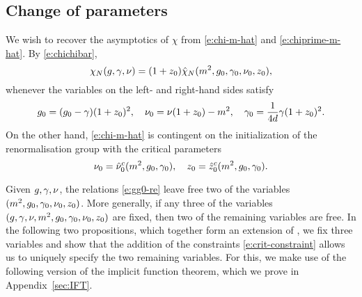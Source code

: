 
\subsection{Change of parameters}
\label{sec:nuztilde}

We wish to recover the asymptotics of $\chi$ from \eqref{e:chi-m-hat} and
\eqref{e:chiprime-m-hat}. By \eqref{e:chichibar},
\begin{equation}
\label{e:chichihat}
\chi_N(g, \gamma, \nu)
	=
(1 + z_0) \hat\chi_N(m^2, g_0, \gamma_0, \nu_0, z_0),
\end{equation}
whenever the variables on the left- and right-hand sides satisfy
\begin{equation}
\label{e:gg0-re}
g_0 = (g_0 - \gamma) (1 + z_0)^2,
\quad
\nu_0 = \nu (1 + z_0) - m^2,
\quad
\gamma_0 = \frac{1}{4d} \gamma (1 + z_0)^2.
\end{equation}
On the other hand, \eqref{e:chi-m-hat} is contingent on the initialization of
the renormalisation group with the critical parameters
\begin{equation}
\label{e:crit-constraint}
\nu_0 = \hat \nu_0^c(m^2, g_0, \gamma_0),
	\quad
z_0   = \hat z_0^c(m^2, g_0, \gamma_0).
\end{equation}

Given $g,\gamma,\nu$,
the relations \eqref{e:gg0-re} leave free two of the variables
$(m^2, g_0, \gamma_0, \nu_0, z_0)$.
More generally, if any three of the variables
$(g, \gamma, \nu, m^2, g_0, \gamma_0, \nu_0, z_0)$
are fixed, then two of the remaining variables are free.
In the following two propositions, which together form an extension of
\cite[Proposition~\ref{log-prop:changevariables}]{BBS-saw4-log},
we fix three variables and show that the addition of the constraints
\eqref{e:crit-constraint}
allows us to uniquely specify the two remaining variables.
For this, we make use of the following version of the
implicit function theorem, which we prove in Appendix~\ref{sec:IFT}.

